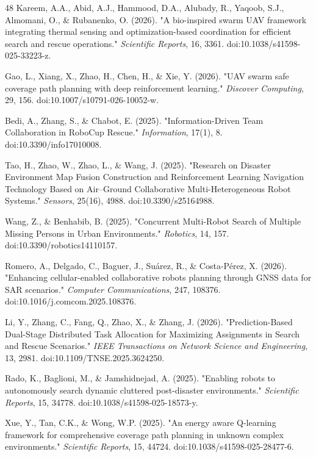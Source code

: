 \documentclass[journal]{IEEEtran}
\begin{document}
\begin{thebibliography}{48}
Kareem, A.A., Abid, A.J., Hammood, D.A., Alubady, R., Yaqoob, S.J., Almomani, O., \& Rubanenko, O. (2026). "A bio-inspired swarm UAV framework integrating thermal sensing and optimization-based coordination for efficient search and rescue operations." \textit{Scientific Reports}, 16, 3361. doi:10.1038/s41598-025-33223-z.

Gao, L., Xiang, X., Zhao, H., Chen, H., \& Xie, Y. (2026). "UAV swarm safe coverage path planning with deep reinforcement learning." \textit{Discover Computing}, 29, 156. doi:10.1007/s10791-026-10052-w.

Bedi, A., Zhang, S., \& Chabot, E. (2025). "Information-Driven Team Collaboration in RoboCup Rescue." \textit{Information}, 17(1), 8. doi:10.3390/info17010008.

Tao, H., Zhao, W., Zhao, L., \& Wang, J. (2025). "Research on Disaster Environment Map Fusion Construction and Reinforcement Learning Navigation Technology Based on Air–Ground Collaborative Multi-Heterogeneous Robot Systems." \textit{Sensors}, 25(16), 4988. doi:10.3390/s25164988.

Wang, Z., \& Benhabib, B. (2025). "Concurrent Multi-Robot Search of Multiple Missing Persons in Urban Environments." \textit{Robotics}, 14, 157. doi:10.3390/robotics14110157.

Romero, A., Delgado, C., Baguer, J., Suárez, R., \& Costa-Pérez, X. (2026). "Enhancing cellular-enabled collaborative robots planning through GNSS data for SAR scenarios." \textit{Computer Communications}, 247, 108376. doi:10.1016/j.comcom.2025.108376.

Li, Y., Zhang, C., Fang, Q., Zhao, X., \& Zhang, J. (2026). "Prediction-Based Dual-Stage Distributed Task Allocation for Maximizing Assignments in Search and Rescue Scenarios." \textit{IEEE Transactions on Network Science and Engineering}, 13, 2981. doi:10.1109/TNSE.2025.3624250.

Rado, K., Baglioni, M., \& Jamshidnejad, A. (2025). "Enabling robots to autonomously search dynamic cluttered post-disaster environments." \textit{Scientific Reports}, 15, 34778. doi:10.1038/s41598-025-18573-y.

Xue, Y., Tan, C.K., \& Wong, W.P. (2025). "An energy aware Q-learning framework for comprehensive coverage path planning in unknown complex environments." \textit{Scientific Reports}, 15, 44724. doi:10.1038/s41598-025-28477-6.


\end{thebibliography}
\end{document}
